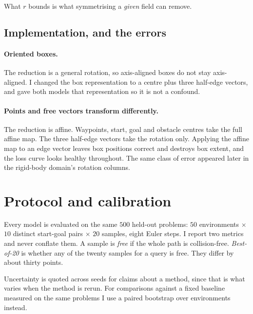 \documentclass[11pt,a4paper]{article}
\begin{document}
What $r$ bounds is what symmetrising a \emph{given} field can remove.

\subsection{Implementation, and the errors}

\paragraph{Oriented boxes.} The reduction is a general rotation, so axis-aligned
boxes do not stay axis-aligned. I changed the box representation to a centre plus
three half-edge vectors, and gave both models that representation so it is not a
confound.

\paragraph{Points and free vectors transform differently.} The reduction is
affine. Waypoints, start, goal and obstacle centres take the full affine map. The
three half-edge vectors take the rotation only. Applying the affine map to an
edge vector leaves box positions correct and destroys box extent, and the loss
curve looks healthy throughout. The same class of error appeared later in the
rigid-body domain's rotation columns.

\section{Protocol and calibration}
\label{sec:protocol}

Every model is evaluated on the same $500$ held-out problems: $50$ environments
$\times$ $10$ distinct start-goal pairs $\times$ $20$ samples, eight Euler
steps. I report two metrics and never conflate them. A sample is \emph{free} if
the whole path is collision-free. \emph{Best-of-20} is whether any of the twenty
samples for a query is free. They differ by about thirty points.

Uncertainty is quoted across seeds for claims about a method, since that is what
varies when the method is rerun. For comparisons against a fixed baseline
measured on the same problems I use a paired bootstrap over environments instead.
\end{document}
